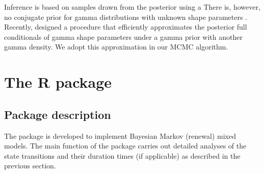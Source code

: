 {Inference is based on samples drawn from the posterior using a  
There is, however, no conjugate prior for gamma distributions with unknown shape parameters \citep{damsleth1975conjugate}. 
Recently, \citet{miller2019fast} designed a procedure that efficiently approximates the posterior full conditionals of gamma shape parameters under a gamma prior with another gamma density. 
We adopt this approximation in our MCMC algorithm. }

\section{The  R package}\label{sec:func}

\subsection{Package description}

The  package is developed to implement Bayesian Markov (renewal) mixed models. 
The main function  of the package carries out detailed analyses of the state transitions and their {duration times} (if applicable) as described in the previous section.






